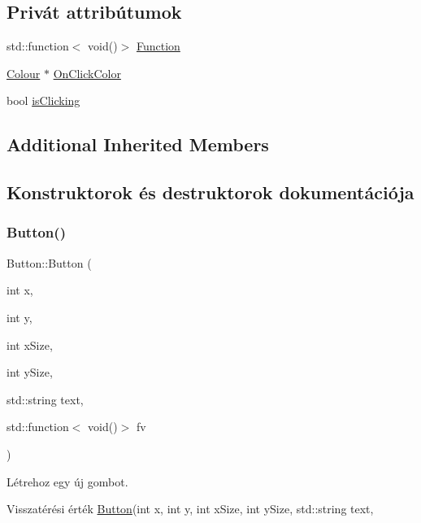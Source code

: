 \subsection*{Privát attribútumok}
\begin{DoxyCompactItemize}
\item 
std\+::function$<$ void()$>$ \hyperlink{class_button_ac125da6324c6d2e107eea9072a6eb351}{Function}
\item 
\hyperlink{class_colour}{Colour} $\ast$ \hyperlink{class_button_a16b3b12b5112e4e9fe88e8f84f4a6dcc}{On\+Click\+Color}
\item 
bool \hyperlink{class_button_a166458b3e6dc6161b64f65a30a8cb31c}{is\+Clicking}
\end{DoxyCompactItemize}
\subsection*{Additional Inherited Members}


\subsection{Konstruktorok és destruktorok dokumentációja}
\mbox{\label{class_button_a33553572657626500239c144f1bbc04f}} 
\subsubsection{\texorpdfstring{Button()}{Button()}}
{\footnotesize\ttfamily Button\+::\+Button (\begin{DoxyParamCaption}\item[{int}]{x,  }\item[{int}]{y,  }\item[{int}]{x\+Size,  }\item[{int}]{y\+Size,  }\item[{std\+::string}]{text,  }\item[{std\+::function$<$ void()$>$}]{fv }\end{DoxyParamCaption})}



Létrehoz egy új gombot. 

\begin{DoxyReturn}{Visszatérési érték}
\hyperlink{class_button}{Button}(int x, int y, int x\+Size, int y\+Size, std\+::string text, 
\end{DoxyReturn}


